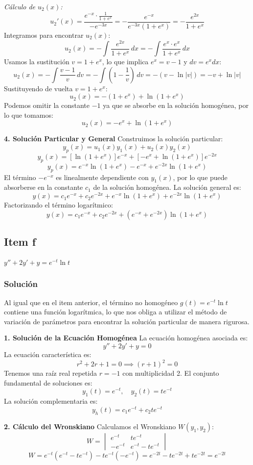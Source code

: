 \documentclass[a4paper]{article}
\begin{document}
\textit{Cálculo de $u_2(x)$:}
$$
u_2'(x) = \frac{e^{-x} \cdot \frac{1}{1+e^x}}{-e^{-3x}} = -\frac{e^{-x}}{e^{-3x}(1+e^x)} = -\frac{e^{2x}}{1+e^x}
$$
Integramos para encontrar $u_2(x)$:
$$
u_2(x) = -\int \frac{e^{2x}}{1+e^x} \, dx = -\int \frac{e^x \cdot e^x}{1+e^x} \, dx
$$
Usamos la sustitución $v = 1+e^x$, lo que implica $e^x = v-1$ y $dv = e^x dx$:
$$
u_2(x) = -\int \frac{v-1}{v} \, dv = -\int \left( 1 - \frac{1}{v} \right) \, dv = -(v - \ln|v|) = -v + \ln|v|
$$
Sustituyendo de vuelta $v = 1+e^x$:
$$
u_2(x) = -(1+e^x) + \ln(1+e^x)
$$
Podemos omitir la constante $-1$ ya que se absorbe en la solución homogénea, por lo que tomamos:
$$
u_2(x) = -e^x + \ln(1+e^x)
$$

\textbf{4. Solución Particular y General}
Construimos la solución particular:
$$
y_p(x) = u_1(x)y_1(x) + u_2(x)y_2(x)
$$
$$
y_p(x) = [\ln(1+e^x)] e^{-x} + [-e^x + \ln(1+e^x)] e^{-2x}
$$
$$
y_p(x) = e^{-x} \ln(1+e^x) - e^{-x} + e^{-2x} \ln(1+e^x)
$$
El término $-e^{-x}$ es linealmente dependiente con $y_1(x)$, por lo que puede absorberse en la constante $c_1$ de la solución homogénea. La solución general es:
$$
y(x) = c_1 e^{-x} + c_2 e^{-2x} + e^{-x} \ln(1+e^x) + e^{-2x} \ln(1+e^x)
$$
Factorizando el término logarítmico:
$$
y(x) = c_1 e^{-x} + c_2 e^{-2x} + (e^{-x} + e^{-2x}) \ln(1+e^x)
$$

\subsection{Item f}
$y'' + 2y' + y = e^{-t} \ln t$

\subsubsection{Solución}
Al igual que en el item anterior, el término no homogéneo $g(t) = e^{-t} \ln t$ contiene una función logarítmica, lo que nos obliga a utilizar el método de variación de parámetros para encontrar la solución particular de manera rigurosa.

\textbf{1. Solución de la Ecuación Homogénea}
La ecuación homogénea asociada es:
$$
y'' + 2y' + y = 0
$$
La ecuación característica es:
$$
r^2 + 2r + 1 = 0 \implies (r+1)^2 = 0
$$
Tenemos una raíz real repetida $r = -1$ con multiplicidad 2. El conjunto fundamental de soluciones es:
$$
y_1(t) = e^{-t}, \quad y_2(t) = t e^{-t}
$$
La solución complementaria es:
$$
y_h(t) = c_1 e^{-t} + c_2 t e^{-t}
$$

\textbf{2. Cálculo del Wronskiano}
Calculamos el Wronskiano $W(y_1, y_2)$:
$$
W = \begin{vmatrix} e^{-t} & t e^{-t} \\ -e^{-t} & e^{-t} - t e^{-t} \end{vmatrix}
$$
$$
W = e^{-t}(e^{-t} - t e^{-t}) - t e^{-t}(-e^{-t}) = e^{-2t} - t e^{-2t} + t e^{-2t} = e^{-2t}
$$
\end{document}
